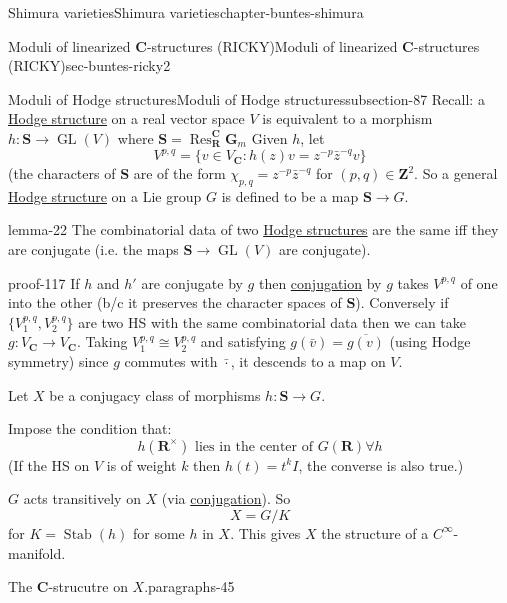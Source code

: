 \documentclass[oneside,10pt,]{book}
\numberwithin{equation}{section}
\newcommand{\ZZ}{\mathbf{Z}}
\newcommand{\RR}{\mathbf{R}}
\newcommand{\CC}{\mathbf{C}}
\DeclareMathOperator{\Stab}{Stab}
\DeclareMathOperator{\Res}{Res}
\DeclareMathOperator{\GL}{GL}
\begin{document}
\begin{chapterptx}{Shimura varieties}{}{Shimura varieties}{}{}{chapter-buntes-shimura}
\begin{sectionptx}{Moduli of linearized \(\CC\)-structures (RICKY)}{}{Moduli of linearized \(\CC\)-structures (RICKY)}{}{}{sec-buntes-ricky2}
\begin{subsectionptx}{Moduli of Hodge structures}{}{Moduli of Hodge structures}{}{}{subsection-87}
\hypertarget{p-1180}{}%
Recall: a \hyperref[def-hodge-str]{Hodge structure} on a real vector space \(V\) is equivalent to a morphism \(h \colon \mathbf S \to \GL(V)\) where \(\mathbf S  = \Res_\RR^\CC \mathbf G_m\) Given \(h\), let%
\begin{equation*}
V^{p,q} = \{ v \in V_\CC : h(z) v= z^{-p} \bar z ^{-q} v\}
\end{equation*}
(the characters of \(\mathbf S\) are of the form \(\chi_{p,q} = z^{-p} \bar z ^{-q}\) for \((p,q)\in \ZZ^2\). So a general \hyperref[def-hodge-str]{Hodge structure} on a Lie group  \(G\) is defined to be a map \(\mathbf S \to G\).%
\begin{lemma}{}{}{lemma-22}%
\hypertarget{p-1181}{}%
The combinatorial data of two \hyperref[def-hodge-str]{Hodge structures} are the same iff they are conjugate (i.e. the maps \(\mathbf S \to \GL(V)\) are conjugate).%
\end{lemma}
\begin{proofptx}{}{proof-117}
\hypertarget{p-1182}{}%
If \(h\) and \(h'\) are conjugate by \(g\) then \hyperref[def-quat-alg-conj-trace-norm]{conjugation} by \(g\) takes \(V^{p,q}\) of one into the other (b/c it preserves the character spaces of \(\mathbf S\)). Conversely if \(\{V_1^{p,q}, V_2^{p,q}\}\) are two HS with the same combinatorial data then we can take \(g \colon V_{\CC} \to V_{\CC}\). Taking \(V_1^{p,q} \cong V_2^{p,q}\) and satisfying \(g(\bar v) = \overline{g(v)}\) (using Hodge symmetry) since \(g\) commutes with \(\bar \cdot\), it descends to a  map on \(V\).%
\end{proofptx}
\hypertarget{p-1183}{}%
Let  \(X\) be a conjugacy class of morphisms \(h\colon \mathbf S \to G\).%
\par
\hypertarget{p-1184}{}%
Impose the condition that:%
\begin{equation}
h(\RR^\times) \text{ lies in the center of }G(\RR) \forall h\label{men-1}
\end{equation}
(If the HS on \(V\) is of weight \(k\) then \(h(t) = t^k I\), the converse is also true.)%
\par
\hypertarget{p-1185}{}%
\(G\) acts transitively on \(X\) (via \hyperref[def-quat-alg-conj-trace-norm]{conjugation}). So%
\begin{equation*}
X=  G/K
\end{equation*}
for \(K = \Stab(h) \) for some \(h\) in \(X\). This gives \(X\) the structure of a \(C^\infty\)-manifold.%
\begin{paragraphs}{The \(\CC\)-strucutre on \(X\).}{paragraphs-45}%

\end{paragraphs}
\end{subsectionptx}
\end{sectionptx}
\end{chapterptx}
\end{document}
